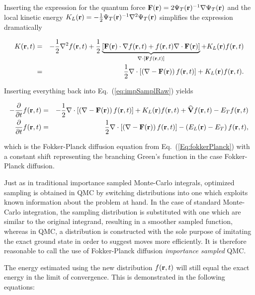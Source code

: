 Inserting the expression for the quantum force $\mathbf{F}(\mathbf{r}) = 2\Psi_T(\mathbf{r})^{-1}\nabla\Psi_T(\mathbf{r})$ and the local kinetic energy $K_L(\mathbf{r}) = -\frac{1}{2}\Psi_T(\mathbf{r})^{-1}\nabla^2\Psi_T(\mathbf{r})$ simplifies the expression dramatically

\begin{eqnarray*}
 K(\mathbf{r}, t) &=& - \frac{1}{2}\nabla^2 f(\mathbf{r}, t) + \frac{1}{2}\underbrace{\left[\mathbf{F}(\mathbf{r})\cdot \nabla f(\mathbf{r}, t) + f(\mathbf{r}, t)\nabla\cdot \mathbf{F}(\mathbf{r})\right]}_{\nabla\cdot\left[\mathbf{F} f(\mathbf{r}, t)\right]} + K_L(\mathbf{r})f(\mathbf{r}, t)\\
         &=& \frac{1}{2}\nabla\cdot \left[\left(\nabla - \mathbf{F}(\mathbf{r})\right)f(\mathbf{r}, t)\right] + K_L(\mathbf{r})f(\mathbf{r}, t).
\end{eqnarray*}

Inserting everything back into Eq.~(\ref{eq:impSamplRaw}) yields

\begin{eqnarray}
 -\frac{\partial}{\partial t}f(\mathbf{r}, t) &=& -\frac{1}{2}\nabla\cdot \left[\left(\nabla - \mathbf{F}(\mathbf{r})\right)f(\mathbf{r}, t)\right] + K_L(\mathbf{r})f(\mathbf{r}, t) + {\bf\widehat{V}}f(\mathbf{r}, t) - E_Tf(\mathbf{r},t) \nonumber\\
  \frac{\partial}{\partial t}f(\mathbf{r}, t)  &=& \frac{1}{2}\nabla\cdot \left[\left(\nabla - \mathbf{F}(\mathbf{r})\right)f(\mathbf{r}, t)\right] - \left(E_L(\mathbf{r}) - E_T\right)f(\mathbf{r}, t), 
\end{eqnarray}

which is the Fokker-Planck diffusion equation from Eq.~(\ref{Eq:fokkerPlanck}) with a constant shift representing the branching Green's function in the case Fokker-Planck diffusion.

Just as in traditional importance sampled Monte-Carlo integrals, optimized sampling is obtained in QMC by switching distributions into one which exploits known information about the problem at hand. In the case of standard Monte-Carlo integration, the sampling distribution is substituted with one which are similar to the original integrand, resulting in a smoother sampled function, whereas in QMC, a distribution is constructed with the sole purpose of imitating the exact ground state in order to suggest moves more efficiently. It is therefore reasonable to call the use of Fokker-Planck diffusion \textit{importance sampled} QMC.

The energy estimated using the new distribution $f(\mathbf{r}, t)$ will still equal the exact energy in the limit of convergence. This is demonstrated in the following equations:

